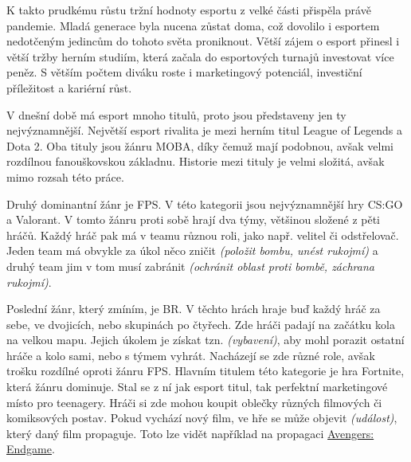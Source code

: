 K takto prudkému růstu tržní hodnoty esportu z velké části přispěla právě pandemie. Mladá generace byla nucena zůstat doma, což dovolilo i esportem nedotčeným jedincům do
tohoto světa proniknout. Větší zájem o esport přinesl i větší tržby herním studiím, která začala do esportových turnajů investovat více peněz\cite{Professeur2021}\cite{liquipedia2021}.
S větším počtem diváku roste i marketingový potenciál, investiční příležitost a kariérní růst.

V dnešní době má esport mnoho titulů, proto jsou představeny jen ty nejvýznamnější. Největší esport rivalita je mezi herním titul League of Legends a Dota 2. Oba tituly jsou žánru
\ac{MOBA}, díky čemuž mají podobnou, avšak velmi rozdílnou fanouškovskou základnu. Historie mezi tituly je velmi složitá, avšak mimo rozsah této práce.

Druhý dominantní žánr je \ac{FPS}. V této kategorii jsou nejvýznamnější hry \ac{CS:GO} a Valorant. V tomto žánru proti sobě hrají dva týmy, většinou složené z pěti hráčů.
Každý hráč pak má v teamu různou roli, jako např. velitel či odstřelovač. Jeden team má obvykle za úkol něco zničit \textit{(položit bombu, unést rukojmí)} a druhý
team jim v tom musí zabránit \textit{(ochránit oblast proti bombě, záchrana rukojmí)}.

Poslední žánr, který zmíním, je \ac{BR}. V těchto hrách hraje buď každý hráč za sebe, ve dvojicích, nebo skupinách po čtyřech. Zde hráči padají na začátku kola na velkou mapu. Jejich úkolem je
získat tzn.  \textit{(vybavení)}, aby mohl porazit ostatní hráče a kolo sami, nebo s týmem vyhrát. Nacházejí se zde různé role, avšak trošku rozdílné oproti žánru \ac{FPS}. Hlavním titulem
této kategorie je hra Fortnite, která žánru dominuje. Stal se z ní jak esport titul, tak perfektní marketingové místo pro teenagery. Hráči si zde mohou koupit oblečky různých filmových či komiksových postav.
Pokud vychází nový film, ve hře se může objevit  \textit{(událost)}, který daný film propaguje. Toto lze vidět například na propagaci \href{https://www.youtube.com/watch?v=TanGK9o_d24}{Avengers: Endgame}.


